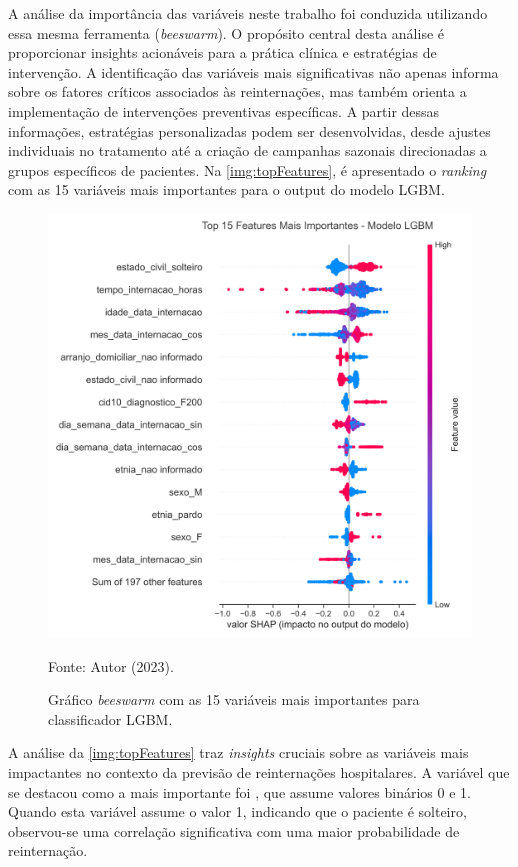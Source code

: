 A análise da importância das variáveis neste trabalho foi conduzida utilizando essa mesma ferramenta (\textit{beeswarm}). O propósito central desta análise é proporcionar insights acionáveis para a prática clínica e estratégias de intervenção. A identificação das variáveis mais significativas não apenas informa sobre os fatores críticos associados às reinternações, mas também orienta a implementação de intervenções preventivas específicas. A partir dessas informações, estratégias personalizadas podem ser desenvolvidas, desde ajustes individuais no tratamento até a criação de campanhas sazonais direcionadas a grupos específicos de pacientes. Na \autoref{img:topFeatures}, é apresentado o \textit{ranking} com as 15 variáveis mais importantes para o output do modelo LGBM.

\begin{figure}
	\centering
	\caption{\label{img:topFeatures}Gráfico \textit{beeswarm} com as 15 variáveis mais importantes para classificador LGBM.}
	\includegraphics[scale=0.7]{USPSC-img/top-features-lgbm.png}
	\begin{center}
		Fonte: Autor (2023).
	\end{center}
\end{figure}

A análise da \autoref{img:topFeatures} traz \textit{insights} cruciais sobre as variáveis mais impactantes no contexto da previsão de reinternações hospitalares. A variável que se destacou como a mais importante foi , que assume valores binários 0 e 1. Quando esta variável assume o valor 1, indicando que o paciente é solteiro, observou-se uma correlação significativa com uma maior probabilidade de reinternação.

